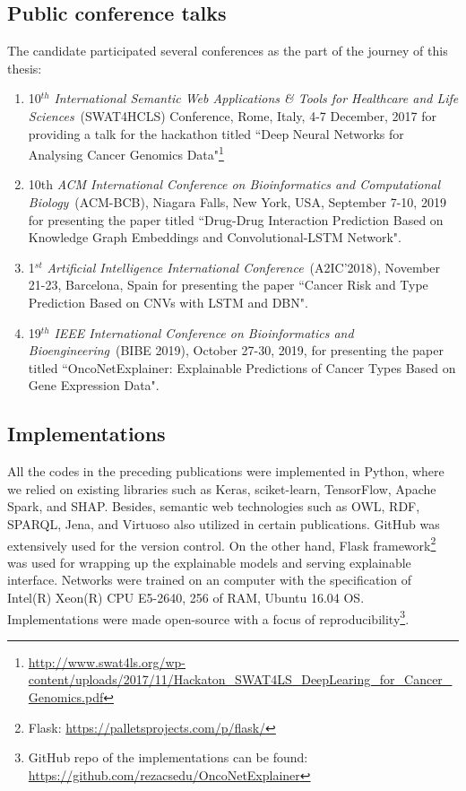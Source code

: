 \subsection{Public conference talks}
The candidate participated several conferences as the part of the journey of this thesis: 
\begin{enumerate}[noitemsep]
    \item 10$^{th}$ \textit{International Semantic Web Applications \& Tools for Healthcare and Life Sciences}~(SWAT4HCLS) Conference, Rome, Italy, 4-7 December, 2017 for providing a talk for the hackathon titled ``Deep Neural Networks for Analysing Cancer Genomics Data"\footnote{\url{http://www.swat4ls.org/wp-content/uploads/2017/11/Hackaton_SWAT4LS_DeepLearing_for_Cancer_Genomics.pdf}}
	\item 10th \textit{ACM International Conference on Bioinformatics and Computational Biology}~(ACM-BCB), Niagara Falls, New York, USA, September 7-10, 2019 for presenting the paper titled ``Drug-Drug Interaction Prediction Based on Knowledge Graph Embeddings and Convolutional-LSTM Network".
	\item 1$^{st}$ \textit{Artificial Intelligence International Conference}~(A2IC'2018), November 21-23, Barcelona, Spain for presenting the paper ``Cancer Risk and Type Prediction Based on CNVs with LSTM and DBN". 
	\item 19$^{th}$ \textit{IEEE International Conference on Bioinformatics and Bioengineering}~(BIBE 2019), October 27-30, 2019, for presenting the paper titled ``OncoNetExplainer: Explainable Predictions of Cancer Types Based on Gene Expression Data".
\end{enumerate}

\subsection{Implementations}
All the codes in the preceding publications were implemented in Python, where we relied on existing libraries such as Keras, sciket-learn, TensorFlow, Apache Spark, and SHAP. %
Besides, semantic web technologies such as OWL, RDF, SPARQL, Jena, and Virtuoso also utilized in certain publications. GitHub was extensively used for the  version control. On the other hand, Flask framework\footnote{Flask: \url{https://palletsprojects.com/p/flask/}} was used for wrapping up the explainable models and serving  explainable interface. Networks were trained on an computer with the specification of Intel(R) Xeon(R) CPU E5-2640, 256 of RAM, Ubuntu 16.04 OS. Implementations were made open-source with a focus of reproducibility\footnote{GitHub repo of the implementations can be found: \url{https://github.com/rezacsedu/OncoNetExplainer}}.

